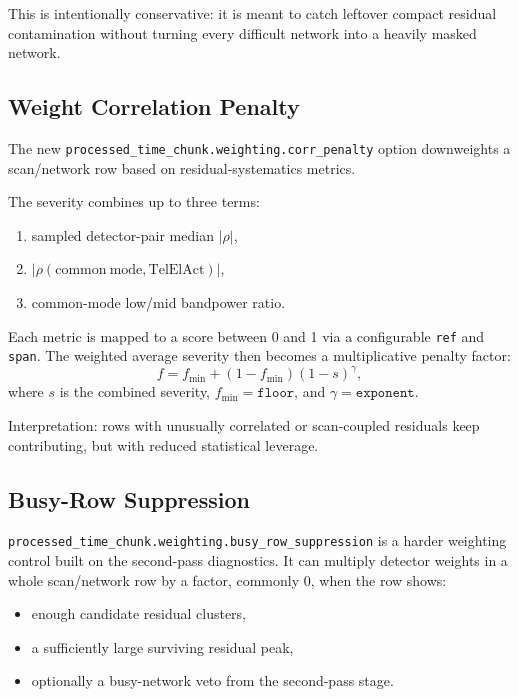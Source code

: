 \documentclass[11pt]{article}
\begin{document}
This is intentionally conservative: it is meant to catch leftover compact
residual contamination without turning every difficult network into a heavily
masked network.

\subsection{Weight Correlation Penalty}

The new \texttt{processed\_time\_chunk.weighting.corr\_penalty} option
downweights a scan/network row based on residual-systematics metrics.

The severity combines up to three terms:

\begin{enumerate}[leftmargin=1.5em]
\item sampled detector-pair median \(|\rho|\),
\item \(|\rho(\mathrm{common\ mode}, \mathrm{TelElAct})|\),
\item common-mode low/mid bandpower ratio.
\end{enumerate}

Each metric is mapped to a score between 0 and 1 via a configurable
\texttt{ref} and \texttt{span}. The weighted average severity then becomes a
multiplicative penalty factor:
\[
f = f_{\min} + (1-f_{\min}) (1-s)^\gamma,
\]
where \(s\) is the combined severity, \(f_{\min}=\texttt{floor}\), and
\(\gamma=\texttt{exponent}\).

Interpretation: rows with unusually correlated or scan-coupled residuals keep
contributing, but with reduced statistical leverage.

\subsection{Busy-Row Suppression}

\texttt{processed\_time\_chunk.weighting.busy\_row\_suppression} is a harder
weighting control built on the second-pass diagnostics. It can multiply
detector weights in a whole scan/network row by a factor, commonly \(0\), when
the row shows:

\begin{itemize}[leftmargin=1.5em]
\item enough candidate residual clusters,
\item a sufficiently large surviving residual peak,
\item optionally a busy-network veto from the second-pass stage.
\end{itemize}
\end{document}
